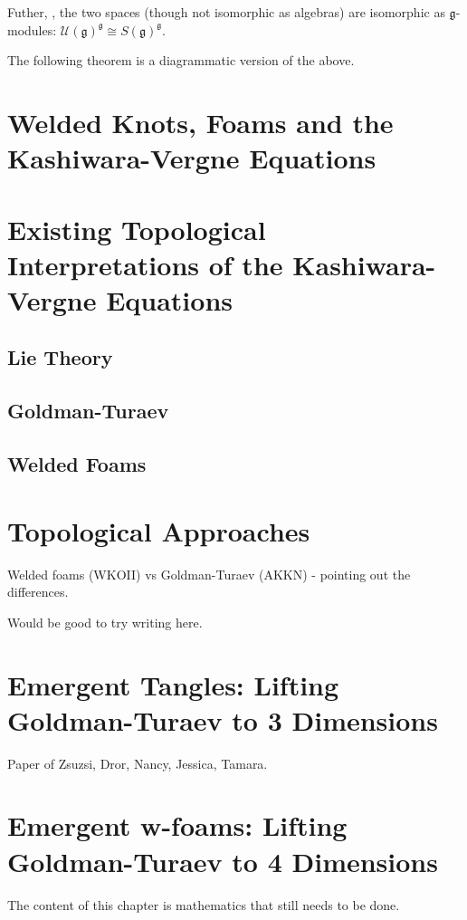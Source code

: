 \documentclass[12pt]{report}
\theoremstyle{regular}
\numberwithin{clause}{chapter}
\newcommand{\draftnote}[1]{
\begin{mdframed}[style=draftnote]
        {\color{Gray}{\scshape Note:} #1 }
\end{mdframed}
}
\newcommand{\scaffold}[1]{
\begin{mdframed}[style=scaffold]
        {\color{teal}#1}
\end{mdframed}
}
\begin{document}
        \scaffold{Futher, \cite{enveloping-algebras}, the two spaces (though not isomorphic as algebras) are isomorphic as \(\mathfrak{g}\)-modules: \(\mathcal{U}(\mathfrak{g})^{\mathfrak{g}} \cong S(\mathfrak{g})^{\mathfrak{g}}\).}

        \scaffold{The following theorem is a diagrammatic version of the above.}

        \chapter{Welded Knots, Foams and the Kashiwara-Vergne Equations}

        \chapter{Existing Topological Interpretations of the Kashiwara-Vergne Equations}

        \section{Lie Theory}

        \section{Goldman-Turaev}

        \section{Welded Foams}

        \chapter{Topological Approaches}
        \scaffold{Welded foams (WKOII) vs Goldman-Turaev (AKKN) - pointing out the differences.}

        \draftnote{Would be good to try writing here.}

        \chapter{Emergent Tangles: Lifting Goldman-Turaev to 3 Dimensions}
        \scaffold{Paper of Zsuzsi, Dror, Nancy, Jessica, Tamara.}

        \chapter{Emergent w-foams: Lifting Goldman-Turaev to 4 Dimensions}
        \draftnote{The content of this chapter is mathematics that still needs to be done.}
\end{document}
